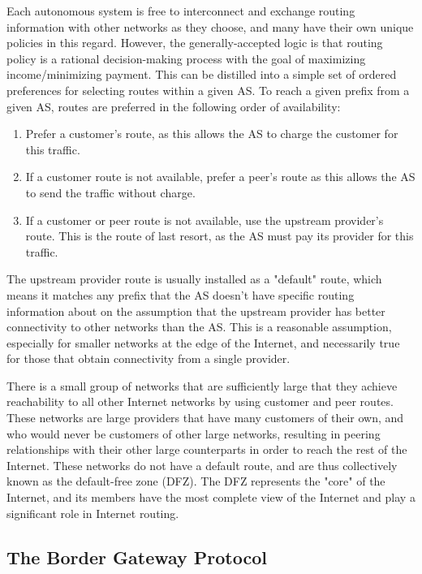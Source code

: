 Each autonomous system is free to interconnect and exchange routing information with other networks as they choose, and many have their own unique policies in this regard. However, the generally-accepted logic is that routing policy is a rational decision-making process with the goal of maximizing income/minimizing payment. This can be distilled into a simple set of ordered preferences for selecting routes within a given AS. To reach a given prefix from a given AS, routes are preferred in the following order of availability:

\begin{enumerate}
    \item{Prefer a customer's route, as this allows the AS to charge the customer for this traffic.}
    \item{If a customer route is not available, prefer a peer's route as this allows the AS to send the traffic without charge.}
    \item{If a customer or peer route is not available, use the upstream provider's route. This is the route of last resort, as the AS must pay its provider for this traffic.}
\end{enumerate}

The upstream provider route is usually installed as a "default" route, which means it matches any prefix that the AS doesn't have specific routing information about on the assumption that the upstream provider has better connectivity to other networks than the AS. This is a reasonable assumption, especially for smaller networks at the edge of the Internet, and necessarily true for those that obtain connectivity from a single provider.

There is a small group of networks that are sufficiently large that they achieve reachability to all other Internet networks by using customer and peer routes. These networks are large providers that have many customers of their own, and who would never be customers of other large networks, resulting in peering relationships with their other large counterparts in order to reach the rest of the Internet. These networks do not have a default route, and are thus collectively known as the default-free zone (DFZ). The DFZ represents the "core" of the Internet, and its members have the most complete view of the Internet and play a significant role in Internet routing.

\subsection{The Border Gateway Protocol}

